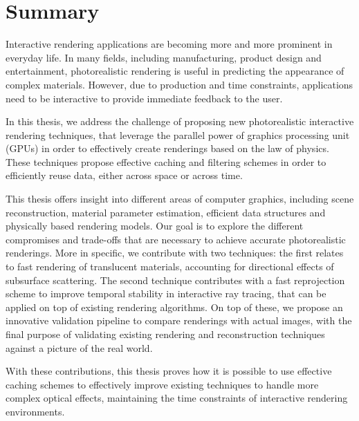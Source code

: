 \chapter{Summary}

Interactive rendering applications are becoming more and more prominent in everyday life. In many fields, including manufacturing, product design and entertainment, photorealistic rendering is useful in predicting the appearance of complex materials. However, due to production and time constraints, applications need to be interactive to provide immediate feedback to the user.

In this thesis, we address the challenge of proposing new photorealistic interactive rendering techniques, that leverage the parallel power of graphics processing unit (GPUs) in order to effectively create renderings based on the law of physics. These techniques propose effective caching and filtering schemes in order to efficiently reuse data, either across space or across time.     
 
This thesis offers insight into different areas of computer graphics, including scene reconstruction, material parameter estimation, efficient data structures and physically based rendering models. Our goal is to explore the different compromises and trade-offs that are necessary to achieve accurate photorealistic renderings. More in specific, we contribute with two techniques: the first relates to fast rendering of translucent materials, accounting for directional effects of subsurface scattering. The second technique contributes with a fast reprojection scheme to improve temporal stability in interactive ray tracing, that can be applied on top of existing rendering algorithms. On top of these, we propose an innovative validation pipeline to compare renderings with actual images, with the final purpose of validating existing rendering and reconstruction techniques against a picture of the real world. 

With these contributions, this thesis proves how it is possible to use effective caching schemes to effectively improve existing techniques to handle more complex optical effects, maintaining the time constraints of interactive rendering environments.